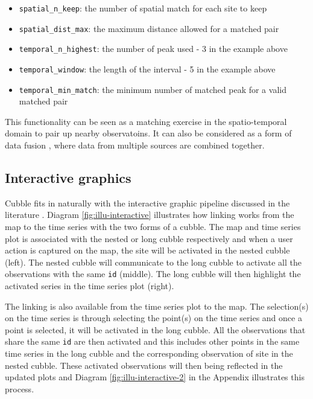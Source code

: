 \documentclass[
]{jss}
\providecommand{\tightlist}{%
  \setlength{\itemsep}{0pt}\setlength{\parskip}{0pt}}
\begin{document}
\begin{itemize}
\tightlist
\item
  \texttt{spatial\_n\_keep}: the number of spatial match for each site
  to keep
\item
  \texttt{spatial\_dist\_max}: the maximum distance allowed for a
  matched pair
\item
  \texttt{temporal\_n\_highest}: the number of peak used - 3 in the
  example above
\item
  \texttt{temporal\_window}: the length of the interval - 5 in the
  example above
\item
  \texttt{temporal\_min\_match}: the minimum number of matched peak for
  a valid matched pair
\end{itemize}

This functionality can be seen as a matching
\citep{stuart2010matching, mcintosh2018using} exercise in the
spatio-temporal domain to pair up nearby observatoins. It can also be
considered as a form of data fusion
\citep{castanedo2013review, cocchi2019data}, where data from multiple
sources are combined together.

\hypertarget{interactive-graphics}{%
\subsection{Interactive graphics}\label{interactive-graphics}}

Cubble fits in naturally with the interactive graphic pipeline discussed
in the literature
\citep{buja1988elements, buja1996interactive, sutherland2000orca, xie2014reactive, cheng2016enabling}.
Diagram \ref{fig:illu-interactive} illustrates how linking works from
the map to the time series with the two forms of a cubble. The map and
time series plot is associated with the nested or long cubble
respectively and when a user action is captured on the map, the site
will be activated in the nested cubble (left). The nested cubble will
communicate to the long cubble to activate all the observations with the
same \texttt{id} (middle). The long cubble will then highlight the
activated series in the time series plot (right).

The linking is also available from the time series plot to the map. The
selection(s) on the time series is through selecting the point(s) on the
time series and once a point is selected, it will be activated in the
long cubble. All the observations that share the same \texttt{id} are
then activated and this includes other points in the same time series in
the long cubble and the corresponding observation of site in the nested
cubble. These activated observations will then being reflected in the
updated plots and Diagram \ref{fig:illu-interactive-2} in the Appendix
illustrates this process.
\end{document}
